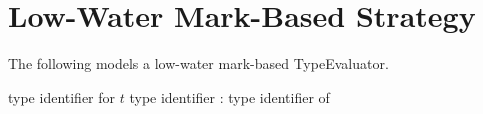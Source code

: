 \section{Low-Water Mark-Based Strategy}

The following models a low-water mark-based TypeEvaluator.

\begin{algorithmic}[1]
                \State \Return type identifier for $t$
            \Else
                \State \Return \New type identifier
            \EndIf
        \Else:
            \State \Return type identifier of 
        \EndIf
    \EndFunction
\end{algorithmic}
